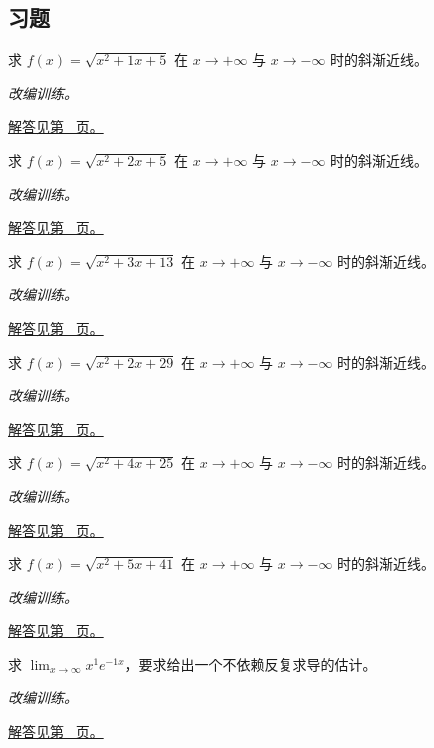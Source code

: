 \documentclass[UTF8,12pt,a4paper,fontset=fandol]{ctexart}
\begin{document}
\subsection{习题}
\begin{example}[二次根式的两端渐近线]\label{ex:c4q1}
求 $f(x)=\sqrt{x^2+1x+5}$ 在 $x\to+\infty$ 与 $x\to-\infty$ 时的斜渐近线。
\par\textit{改编训练。}\par\hyperref[ans:c4q1]{解答见第~\pageref{ans:c4q1} 页。}
\end{example}
\begin{example}[二次根式的两端渐近线]\label{ex:c4q2}
求 $f(x)=\sqrt{x^2+2x+5}$ 在 $x\to+\infty$ 与 $x\to-\infty$ 时的斜渐近线。
\par\textit{改编训练。}\par\hyperref[ans:c4q2]{解答见第~\pageref{ans:c4q2} 页。}
\end{example}
\begin{example}[二次根式的两端渐近线]\label{ex:c4q3}
求 $f(x)=\sqrt{x^2+3x+13}$ 在 $x\to+\infty$ 与 $x\to-\infty$ 时的斜渐近线。
\par\textit{改编训练。}\par\hyperref[ans:c4q3]{解答见第~\pageref{ans:c4q3} 页。}
\end{example}
\begin{example}[二次根式的两端渐近线]\label{ex:c4q4}
求 $f(x)=\sqrt{x^2+2x+29}$ 在 $x\to+\infty$ 与 $x\to-\infty$ 时的斜渐近线。
\par\textit{改编训练。}\par\hyperref[ans:c4q4]{解答见第~\pageref{ans:c4q4} 页。}
\end{example}
\begin{example}[二次根式的两端渐近线]\label{ex:c4q5}
求 $f(x)=\sqrt{x^2+4x+25}$ 在 $x\to+\infty$ 与 $x\to-\infty$ 时的斜渐近线。
\par\textit{改编训练。}\par\hyperref[ans:c4q5]{解答见第~\pageref{ans:c4q5} 页。}
\end{example}
\begin{example}[二次根式的两端渐近线]\label{ex:c4q6}
求 $f(x)=\sqrt{x^2+5x+41}$ 在 $x\to+\infty$ 与 $x\to-\infty$ 时的斜渐近线。
\par\textit{改编训练。}\par\hyperref[ans:c4q6]{解答见第~\pageref{ans:c4q6} 页。}
\end{example}
\begin{example}[指数增长压过多项式]\label{ex:c4q7}
求 $\displaystyle\lim_{x\to\infty}x^{1}e^{-1x}$，要求给出一个不依赖反复求导的估计。
\par\textit{改编训练。}\par\hyperref[ans:c4q7]{解答见第~\pageref{ans:c4q7} 页。}
\end{example}
\end{document}
